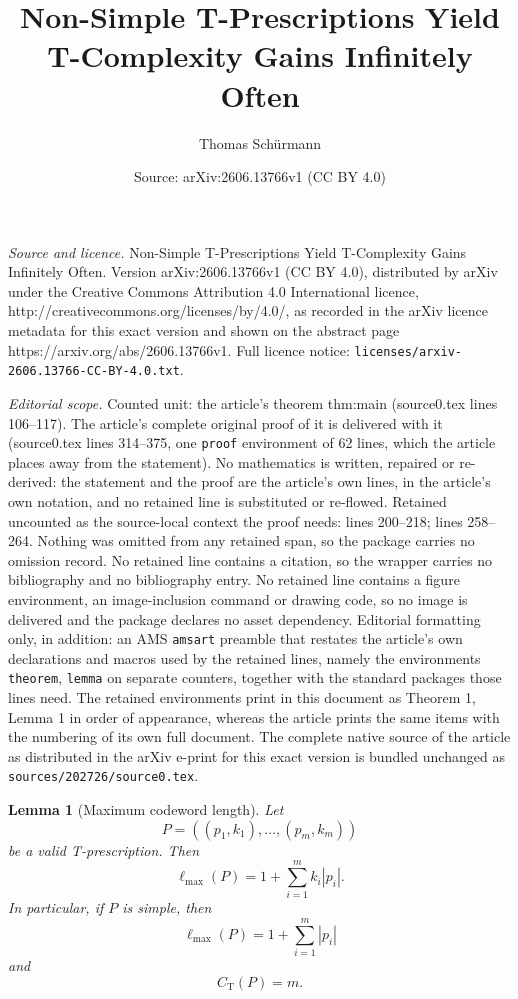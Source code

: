 \documentclass[10pt,a4paper]{amsart}
\title{Non-Simple T-Prescriptions Yield T-Complexity Gains Infinitely Often}
\author{Thomas Sch\"urmann}
\date{Source: arXiv:2606.13766v1 (CC BY 4.0)}
\newtheorem{lemma}{Lemma}
\newcommand{\CT}{C_{\mathrm T}}
\newcommand{\ellmax}{\ell_{\max}}
\begin{document}
\maketitle

\noindent\emph{Source and licence.} Non-Simple T-Prescriptions Yield T-Complexity Gains Infinitely Often. Version arXiv:2606.13766v1 (CC BY 4.0), distributed by arXiv under the Creative Commons Attribution 4.0 International licence, http://creativecommons.org/licenses/by/4.0/, as recorded in the arXiv licence metadata for this exact version and shown on the abstract page https://arxiv.org/abs/2606.13766v1. Full licence notice: \texttt{licenses/arxiv-2606.13766-CC-BY-4.0.txt}.\par\smallskip

\noindent\textit{Editorial scope.} Counted unit: the article's theorem thm:main (source0.tex lines 106--117). The article's complete original proof of it is delivered with it (source0.tex lines 314--375, one \texttt{proof} environment of 62 lines, which the article places away from the statement). No mathematics is written, repaired or re-derived: the statement and the proof are the article's own lines, in the article's own notation, and no retained line is substituted or re-flowed.  Retained uncounted as the source-local context the proof needs: lines 200--218; lines 258--264.  Nothing was omitted from any retained span, so the package carries no omission record.  No retained line contains a citation, so the wrapper carries no bibliography and no bibliography entry.  No retained line contains a figure environment, an image-inclusion command or drawing code, so no image is delivered and the package declares no asset dependency.  Editorial formatting only, in addition: an AMS \texttt{amsart} preamble that restates the article's own declarations and macros used by the retained lines, namely the environments \texttt{theorem}, \texttt{lemma} on separate counters, together with the standard packages those lines need.  The retained environments print in this document as Theorem 1, Lemma 1 in order of appearance, whereas the article prints the same items with the numbering of its own full document.  The complete native source of the article as distributed in the arXiv e-print for this exact version is bundled unchanged as \texttt{sources/202726/source0.tex}.
\begin{lemma}[Maximum codeword length]
\label{lem:length}
Let
\begin{equation}
P=((p_1,k_1),\ldots,(p_m,k_m))
\end{equation}
be a valid T-prescription. Then
\begin{equation}
\ellmax(P)=1+\sum_{i=1}^{m}k_i|p_i|.
\end{equation}
In particular, if $P$ is simple, then
\begin{equation}
\ellmax(P)=1+\sum_{i=1}^{m}|p_i|
\end{equation}
and
\begin{equation}
\CT(P)=m.
\end{equation}
\end{lemma}
\end{document}
